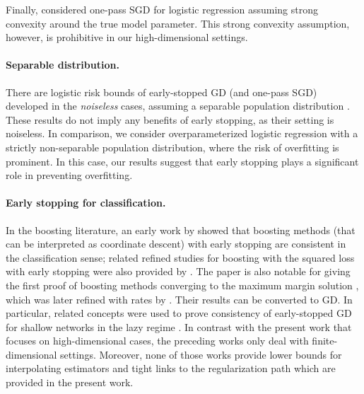 Finally, \citet{bach2014adaptivity} considered one-pass SGD for logistic regression assuming strong convexity around the true model parameter.
This strong convexity assumption, however, is prohibitive in our high-dimensional settings. 



\paragraph{Separable distribution.}
There are logistic risk bounds of early-stopped GD (and one-pass SGD) developed in the \emph{noiseless} cases, assuming a separable population distribution \citep{ji2018risk,shamir2021gradient,telgarsky2022stochastic,schliserman2024tight}. 
These results do not imply any benefits of early stopping, as their setting is noiseless. 
In comparison, we consider overparameterized logistic regression with a strictly non-separable population distribution, where the risk of overfitting is prominent.
In this case, our results suggest that early stopping plays a significant role in preventing overfitting.

\paragraph{Early stopping for classification.}  
In the boosting literature, an early work by \citet{zhang2005boosting}
showed that boosting methods (that can be interpreted as coordinate descent) with early stopping
are consistent in the classification sense;
related refined studies for boosting with the squared loss with
early stopping were also provided by \citet{buhlmann2003boosting}.  
The paper is also notable for giving the first proof of boosting methods converging to the maximum margin solution \citep[Appendix D]{zhang2005boosting}, which was later
refined with rates by \citep{telgarsky2013margins}. 
Their results can be converted to GD.
In particular, related concepts were used to prove consistency
of early-stopped GD for shallow networks in the lazy regime \citep{ji2021early}.
In contrast with the present work that focuses on high-dimensional cases, the preceding works only deal with finite-dimensional settings.  Moreover, none of those works provide lower bounds for interpolating estimators and tight links to the regularization path which are provided in the present work.







